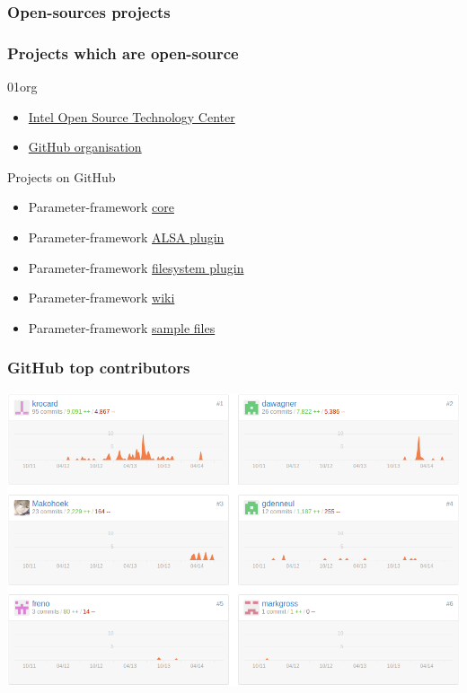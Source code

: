 \subsubsection{Open-sources projects}
\begin{frame}
    \frametitle{Projects which are open-source}
    \begin{block}{01org}
        \begin{itemize}
            \item \href{https://01.org/}{Intel Open Source Technology Center}
            \item \href{https://github.com/orgs/01org/teams/01-org-parameter-framework-owners}{GitHub organisation}
        \end{itemize}
   \end{block}
    \begin{block}{Projects on GitHub}
        \begin{itemize}
            \item Parameter-framework \href{https://github.com/01org/parameter-framework}{core}
            \item Parameter-framework \href{https://github.com/01org/parameter-framework-plugins-alsa}{ALSA plugin}
            \item Parameter-framework \href{https://github.com/01org/parameter-framework-plugins-filesystem}{filesystem plugin}
            \item Parameter-framework \href{https://github.com/01org/parameter-framework/wiki}{wiki}
            \item Parameter-framework \href{https://github.com/01org/parameter-framework-samples}{sample files}
        \end{itemize}
    \end{block}
\end{frame}

\begin{frame}
    \frametitle{GitHub top contributors}
    \centering
    \includegraphics[width=\textwidth]{../../report/src/img/statsGitHub.png}
\end{frame}
